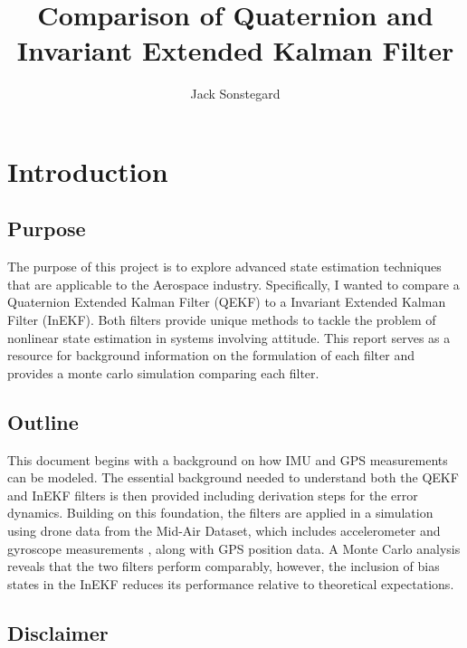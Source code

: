 \title{Comparison of Quaternion and Invariant Extended Kalman Filter}
\author{Jack Sonstegard}

\maketitle

\section{Introduction}
\subsection{Purpose}

The purpose of this project is to explore advanced state estimation techniques that are applicable to the Aerospace industry. Specifically, I wanted to compare a Quaternion Extended Kalman Filter (QEKF) to a Invariant Extended Kalman Filter (InEKF). Both filters provide unique methods to tackle the problem of nonlinear state estimation in systems involving attitude. This report serves as a resource for background information on the formulation of each filter and provides a monte carlo simulation comparing each filter.

\subsection{Outline}

This document begins with a background on how IMU and GPS measurements can be modeled. The essential background needed to understand both the QEKF and InEKF filters is then provided including derivation steps for the error dynamics. Building on this foundation, the filters are applied in a simulation using drone data from the Mid-Air Dataset, which includes accelerometer and gyroscope measurements \cite{Fonder2019MidAir}, along with GPS position data. A Monte Carlo analysis reveals that the two filters perform comparably, however, the inclusion of bias states in the InEKF reduces its performance relative to theoretical expectations.

\subsection{Disclaimer}

